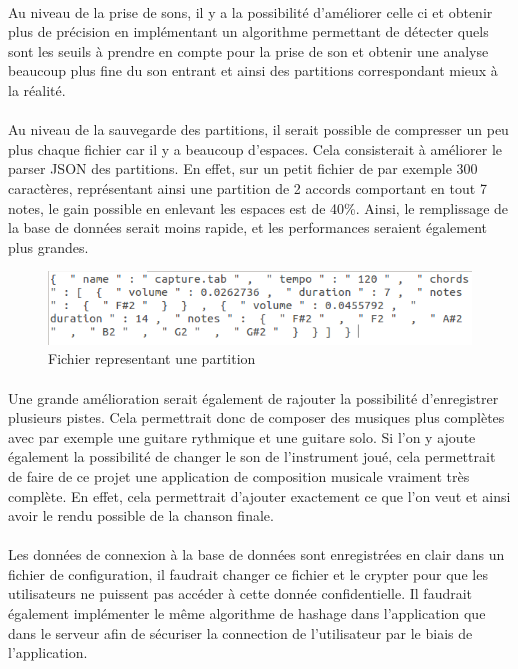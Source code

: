 \paragraph{}
Au niveau de la prise de sons, il y a la possibilité d'améliorer celle ci et obtenir plus de précision 
en implémentant un algorithme permettant de détecter quels sont les seuils à prendre en compte pour la prise de son 
et obtenir une analyse beaucoup plus fine du son entrant et ainsi des partitions correspondant mieux à la 
réalité. 
\paragraph{}
Au niveau de la sauvegarde des partitions, il serait possible de compresser un peu plus chaque fichier 
car il y a beaucoup d'espaces. Cela consisterait à améliorer le parser JSON des partitions. En effet, sur un petit fichier 
de par exemple 300 caractères, représentant ainsi une partition de 2 accords comportant en tout 7 notes, le gain 
possible en enlevant les espaces est de 40\%. Ainsi, le remplissage de la base de données serait moins rapide, 
et les performances seraient également plus grandes.

\begin{figure}[H]
\centering
\includegraphics[scale=0.5]{FichierPartition}
\caption{Fichier representant une partition}
\end{figure}


\paragraph{}
Une grande amélioration serait également de rajouter la possibilité d'enregistrer plusieurs pistes. Cela permettrait donc de 
composer des musiques plus complètes avec par exemple une guitare rythmique et une guitare solo. Si l'on y ajoute également 
la possibilité de changer le son de l'instrument joué, cela permettrait de faire de ce projet une application de 
composition musicale vraiment très complète. En effet, cela permettrait d'ajouter exactement ce que l'on veut et ainsi 
avoir le rendu possible de la chanson finale.

\paragraph{}
Les données de connexion à la base de données sont enregistrées en clair dans un fichier de configuration, il faudrait changer 
ce fichier et le crypter pour que les utilisateurs ne puissent pas accéder à cette donnée confidentielle. Il faudrait également 
implémenter le même algorithme de hashage dans l'application que dans le serveur afin de sécuriser la connection de l'utilisateur 
par le biais de l'application. 

